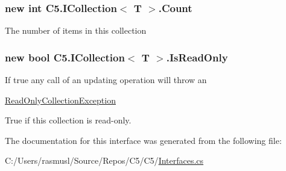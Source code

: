 \subsubsection[{Count}]{\setlength{\rightskip}{0pt plus 5cm}new int {\bf C5.\+I\+Collection}$<$ T $>$.Count\hspace{0.3cm}{\ttfamily [get]}}\label{interface_c5_1_1_i_collection_abddff5406ccd4e98d8d96f41bf9d6d5b}




The number of items in this collection\hypertarget{interface_c5_1_1_i_collection_a94b0751f2b2fbd0519233b2755c055b4}{}
\subsubsection[{Is\+Read\+Only}]{\setlength{\rightskip}{0pt plus 5cm}new bool {\bf C5.\+I\+Collection}$<$ T $>$.Is\+Read\+Only\hspace{0.3cm}{\ttfamily [get]}}\label{interface_c5_1_1_i_collection_a94b0751f2b2fbd0519233b2755c055b4}


If true any call of an updating operation will throw an 

{\ttfamily \hyperlink{class_c5_1_1_read_only_collection_exception}{Read\+Only\+Collection\+Exception}} 

True if this collection is read-\/only.

The documentation for this interface was generated from the following file\+:\begin{DoxyCompactItemize}
\item 
C\+:/\+Users/rasmusl/\+Source/\+Repos/\+C5/\+C5/\hyperlink{_interfaces_8cs}{Interfaces.\+cs}\end{DoxyCompactItemize}
